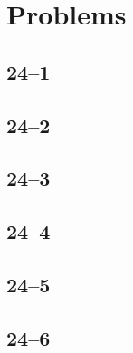 \documentclass{article}
\begin{document}
\section*{Problems}
\subsection{24--1}
\subsection{24--2}
\subsection{24--3}
\subsection{24--4}
\subsection{24--5}
\subsection{24--6}
\end{document}
